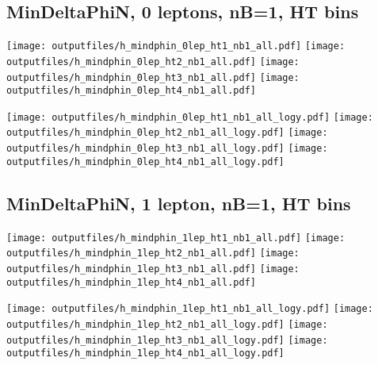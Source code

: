 \documentclass[11pt]{article}
\begin{document}
    \clearpage



    \subsection{ MinDeltaPhiN, 0 leptons, nB=1, HT bins }

    \noindent
     \texttt{[image: outputfiles/h\_mindphin\_0lep\_ht1\_nb1\_all.pdf]}
     \texttt{[image: outputfiles/h\_mindphin\_0lep\_ht2\_nb1\_all.pdf]}
     \texttt{[image: outputfiles/h\_mindphin\_0lep\_ht3\_nb1\_all.pdf]}
     \texttt{[image: outputfiles/h\_mindphin\_0lep\_ht4\_nb1\_all.pdf]}

    \noindent
     \texttt{[image: outputfiles/h\_mindphin\_0lep\_ht1\_nb1\_all\_logy.pdf]}
     \texttt{[image: outputfiles/h\_mindphin\_0lep\_ht2\_nb1\_all\_logy.pdf]}
     \texttt{[image: outputfiles/h\_mindphin\_0lep\_ht3\_nb1\_all\_logy.pdf]}
     \texttt{[image: outputfiles/h\_mindphin\_0lep\_ht4\_nb1\_all\_logy.pdf]}

    \clearpage




    \subsection{ MinDeltaPhiN, 1 lepton, nB=1, HT bins }

    \noindent
     \texttt{[image: outputfiles/h\_mindphin\_1lep\_ht1\_nb1\_all.pdf]}
     \texttt{[image: outputfiles/h\_mindphin\_1lep\_ht2\_nb1\_all.pdf]}
     \texttt{[image: outputfiles/h\_mindphin\_1lep\_ht3\_nb1\_all.pdf]}
     \texttt{[image: outputfiles/h\_mindphin\_1lep\_ht4\_nb1\_all.pdf]}

    \noindent
     \texttt{[image: outputfiles/h\_mindphin\_1lep\_ht1\_nb1\_all\_logy.pdf]}
     \texttt{[image: outputfiles/h\_mindphin\_1lep\_ht2\_nb1\_all\_logy.pdf]}
     \texttt{[image: outputfiles/h\_mindphin\_1lep\_ht3\_nb1\_all\_logy.pdf]}
     \texttt{[image: outputfiles/h\_mindphin\_1lep\_ht4\_nb1\_all\_logy.pdf]}

    \clearpage
\end{document}
